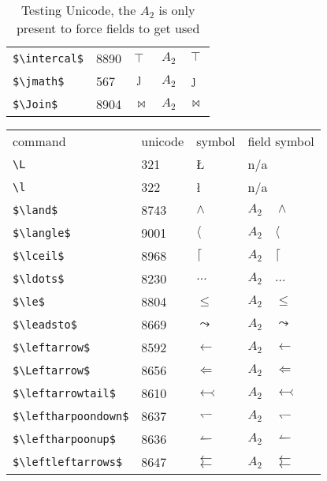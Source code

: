 \documentclass{article}
\begin{document}
\begin{table}
\begin{center}
\begin{tabular}{llll}
 \verb#$\intercal$#           & 8890 & $\intercal$           & $A_2\quad \intercal$\\
 \verb#$\jmath$#               & 567 & $\jmath$              & $A_2\quad \jmath$\\
 \verb#$\Join$#               & 8904 & $\Join$               & $A_2\quad \Join$\\
\end{tabular}
\end{center}
\caption{Testing Unicode, the $A_2$ is only present to force fields to get used}
\end{table}

\begin{table}
\begin{center}
\begin{tabular}{llll}
 command                    &unicode & symbol                & field symbol\\
 \verb#\L#                     & 321 & \L                    & n/a\\
 \verb#\l#                     & 322 & \l                    & n/a\\
 \verb#$\land$#               & 8743 & $\land$               & $A_2\quad \land$\\
 \verb#$\langle$#             & 9001 & $\langle$             & $A_2\quad \langle$\\
 \verb#$\lceil$#              & 8968 & $\lceil$              & $A_2\quad \lceil$\\
 \verb#$\ldots$#              & 8230 & $\ldots$              & $A_2\quad \ldots$\\
 \verb#$\le$#                 & 8804 & $\le$                 & $A_2\quad \le$\\
 \verb#$\leadsto$#            & 8669 & $\leadsto$            & $A_2\quad \leadsto$\\
 \verb#$\leftarrow$#          & 8592 & $\leftarrow$          & $A_2\quad \leftarrow$\\
 \verb#$\Leftarrow$#          & 8656 & $\Leftarrow$          & $A_2\quad \Leftarrow$\\
 \verb#$\leftarrowtail$#      & 8610 & $\leftarrowtail$      & $A_2\quad \leftarrowtail$\\
 \verb#$\leftharpoondown$#    & 8637 & $\leftharpoondown$    & $A_2\quad \leftharpoondown$\\
 \verb#$\leftharpoonup$#      & 8636 & $\leftharpoonup$      & $A_2\quad \leftharpoonup$\\
 \verb#$\leftleftarrows$#     & 8647 & $\leftleftarrows$     & $A_2\quad \leftleftarrows$\\

\end{tabular}
\end{center}
\end{table}
\end{document}
